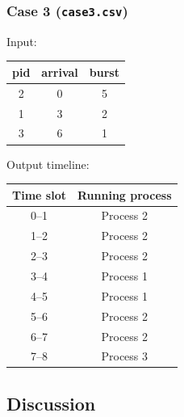 \documentclass[11pt,a4paper]{article}
\begin{document}
\subsubsection{Case 3 (\texttt{case3.csv})}
Input:
\begin{center}
\begin{tabular}{ccc}
\toprule
pid & arrival & burst \\
\midrule
2 & 0 & 5 \\
1 & 3 & 2 \\
3 & 6 & 1 \\
\bottomrule
\end{tabular}
\end{center}

Output timeline:
\begin{center}
\begin{tabular}{cc}
\toprule
Time slot & Running process \\
\midrule
0--1  & Process 2 \\
1--2  & Process 2 \\
2--3  & Process 2 \\
3--4  & Process 1 \\
4--5  & Process 1 \\
5--6  & Process 2 \\
6--7  & Process 2 \\
7--8  & Process 3 \\
\bottomrule
\end{tabular}
\end{center}

\subsection{Discussion}
\end{document}
